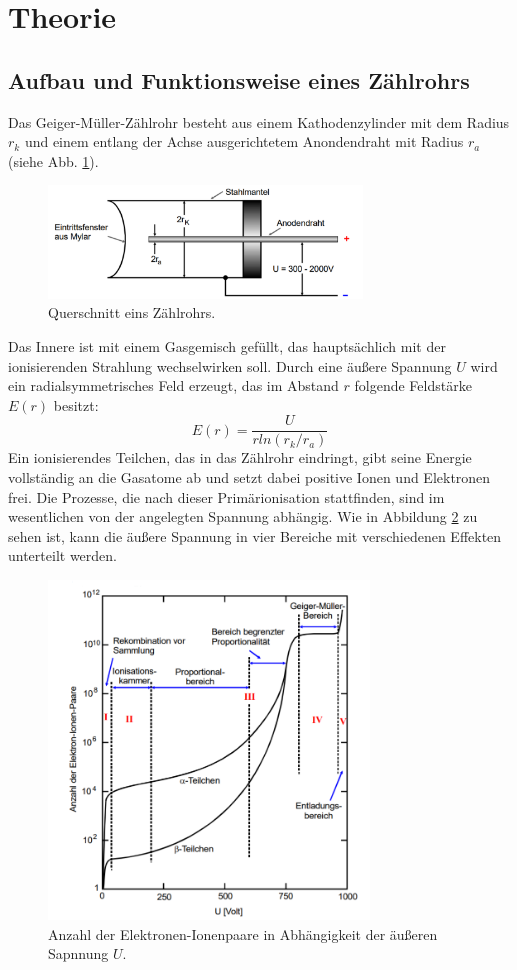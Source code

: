 \section{Theorie}
\label{sec:Theorie}

\subsection{Aufbau und Funktionsweise eines Zählrohrs}

Das Geiger-Müller-Zählrohr besteht aus einem Kathodenzylinder mit dem Radius $r_k$ und einem entlang der Achse ausgerichtetem Anondendraht mit Radius $r_a$ (siehe Abb. \ref{fig:Rohr}).
\begin{figure}
  \centering
  \includegraphics[height=3cm]{data/Rohr.png}
  \caption{Querschnitt eins Zählrohrs. \cite{V703}}
  \label{fig:Rohr}
\end{figure}
Das Innere ist mit einem Gasgemisch gefüllt, das hauptsächlich mit der ionisierenden Strahlung wechselwirken soll.
Durch eine äußere Spannung $U$ wird ein radialsymmetrisches Feld erzeugt, das im Abstand $r$ folgende Feldstärke $E(r)$ besitzt:
\begin{equation}
  E(r) = \frac{U}{r ln(r_k/r_a)}
  \label{eqn:gl1s}
\end{equation}
Ein ionisierendes Teilchen, das in das Zählrohr eindringt, gibt seine Energie vollständig an die Gasatome ab und setzt dabei positive Ionen und Elektronen frei.
Die Prozesse, die nach dieser Primärionisation stattfinden, sind im wesentlichen von der angelegten Spannung abhängig.
Wie in Abbildung \ref{fig:Bereiche} zu sehen ist, kann die äußere Spannung in vier Bereiche mit verschiedenen Effekten unterteilt werden.
\begin{figure}
  \centering
  \includegraphics[height=9cm]{data/Bereiche.png}
  \caption{Anzahl der Elektronen-Ionenpaare in Abhängigkeit der äußeren Sapnnung $U$. \cite{V703}}
  \label{fig:Bereiche}
\end{figure}

